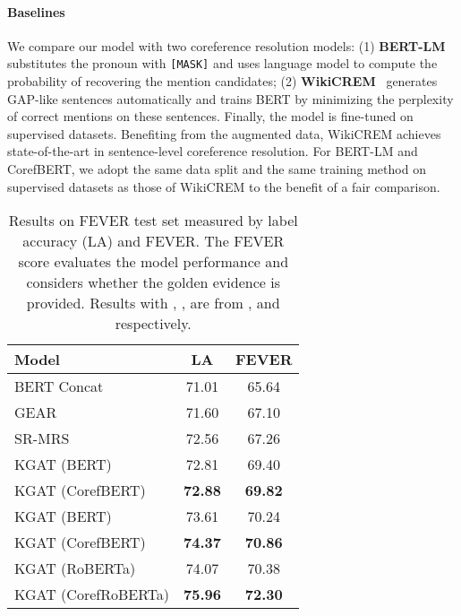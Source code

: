 \documentclass[11pt,a4paper]{article}
\newcommand\CorefBERT{CorefBERT\xspace}
\newcommand\BASESIZE{\xspace}
\newcommand\LARGESIZE{\xspace}
\begin{document}
\vspace{-0.1em}
\paragraph{Baselines}
We  compare our model with two coreference resolution models: (1) \textbf{BERT-LM}~\citep{ASimpleMethodforCommonsenseReasoning} substitutes the pronoun with \texttt{[MASK]} and uses language model to compute the probability of recovering the mention candidates; (2) \textbf{WikiCREM}~\citep{wikicrem} generates GAP-like sentences automatically and trains BERT by minimizing the perplexity of correct mentions on these sentences. Finally, the model is fine-tuned on supervised datasets. Benefiting from the augmented data, WikiCREM achieves state-of-the-art in sentence-level coreference resolution. For BERT-LM and \CorefBERT, we adopt the same data split and the same training method on supervised datasets as those of WikiCREM to the benefit of a fair comparison.












\begin{table}[!t]
 \small
 \centering
 \begin{tabular}{l c c }
 \toprule

 \multirow{1}{*}{Model}   &  LA        & FEVER\\
 \midrule
 BERT Concat & 71.01& 65.64\\
 GEAR    &71.60 &67.10\\
 SR-MRS     &72.56& 67.26\\
 KGAT (BERT\BASESIZE) & 72.81& 69.40\\
 KGAT (CorefBERT\BASESIZE) &\bf{72.88} & \bf{69.82}\\
 \midrule
 KGAT (BERT\LARGESIZE) & 73.61 & 70.24\\
 KGAT (CorefBERT\LARGESIZE) &\bf{74.37} & \bf{70.86}\\
 \midrule
 KGAT (RoBERTa\LARGESIZE) & 74.07& 70.38\\
 KGAT (CorefRoBERTa) &\bf{75.96} & \bf{72.30}\\
\bottomrule
 \end{tabular}
 \caption{Results on FEVER test set measured by label accuracy (LA) and FEVER. The FEVER score evaluates the model performance and considers whether the golden evidence is provided. Results with , ,  are from \citet{Zhoujie}, \citet{SR-MRS} and \citet{Zhenghao} respectively. }
 \label{tab:Fever_result}
\end{table}
\end{document}
